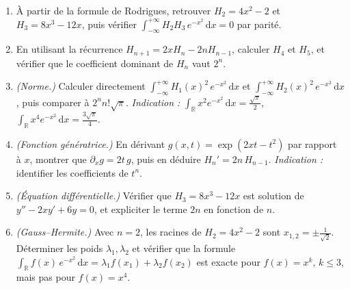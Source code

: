 \begin{mdframed}[style=exobar]
  \begin{enumerate}
    \item À partir de la formule de Rodrigues, retrouver $H_2=4x^2-2$ et
          $H_3=8x^3-12x$, puis vérifier
          $\int_{-\infty}^{+\infty} H_2 H_3\,e^{-x^2}\,\mathrm{d}x=0$ par
          parité.

    \item En utilisant la récurrence $H_{n+1}=2xH_n-2nH_{n-1}$, calculer
          $H_4$ et $H_5$, et vérifier que le coefficient dominant de $H_n$
          vaut $2^n$.

    \item \textit{(Norme.)} Calculer directement
          $\int_{-\infty}^{+\infty} {H_1(x)}^2\,e^{-x^2}\,\mathrm{d}x$ et
          $\int_{-\infty}^{+\infty} {H_2(x)}^2\,e^{-x^2}\,\mathrm{d}x$, puis
          comparer à $2^n n!\sqrt{\pi}$.
          \textit{Indication :} $\int_{\mathbb{R}}x^2 e^{-x^2}\,\mathrm{d}x=\tfrac{\sqrt{\pi}}{2}$,
          $\int_{\mathbb{R}}x^4 e^{-x^2}\,\mathrm{d}x=\tfrac{3\sqrt{\pi}}{4}$.

    \item \textit{(Fonction génératrice.)} En dérivant
          $g(x,t)=\exp(2xt-t^2)$ par rapport à $x$, montrer que
          $\partial_x g=2t\,g$, puis en déduire $H_n'=2n\,H_{n-1}$.
          \textit{Indication :} identifier les coefficients de $t^n$.

    \item \textit{(Équation différentielle.)} Vérifier que $H_3=8x^3-12x$
          est solution de $y''-2xy'+6y=0$, et expliciter le terme $2n$ en
          fonction de $n$.

    \item \textit{(Gauss--Hermite.)} Avec $n=2$, les racines de
          $H_2=4x^2-2$ sont $x_{1,2}=\pm\tfrac{1}{\sqrt{2}}$. Déterminer
          les poids $\lambda_1,\lambda_2$ et vérifier que la formule
          $\int_{\mathbb{R}} f(x)\,e^{-x^2}\,\mathrm{d}x
          =\lambda_1 f(x_1)+\lambda_2 f(x_2)$ est exacte pour $f(x)=x^k$,
          $k\leq 3$, mais pas pour $f(x)=x^4$.
  \end{enumerate}
\end{mdframed}

